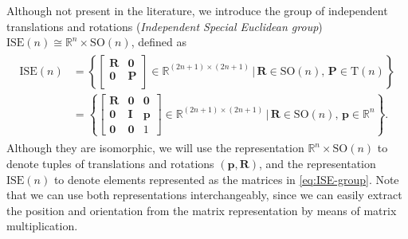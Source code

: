 \begin{example}\label{ex:independent-translation-rotation-ISE}
    Although not present in the literature, we introduce the group of independent translations and rotations (\emph{Independent Special Euclidean group}) $\text{ISE}(n)\cong\mathbb{R}^n\times\text{SO}(n)$, defined as
    \begin{align}
        \begin{split}
            \text{ISE}(n) &= \left\{\begin{bmatrix}
            \mathbf{R} & \mathbf{0}\\
            \mathbf{0} & \mathbf{P}\\
            \end{bmatrix}\in\mathbb{R}^{(2n+1)\times(2n+1)}\,|\, \mathbf{R}\in\text{SO}(n),\,\mathbf{P}\in\text{T}(n)\right\}\\
            &= \left\{\begin{bmatrix}
            \mathbf{R} & \mathbf{0} & \mathbf{0}\\
            \mathbf{0} & \mathbf{I} & \mathbf{p}\\
            \mathbf{0} & \mathbf{0} & 1
            \end{bmatrix}\in\mathbb{R}^{(2n+1)\times(2n+1)}\,|\, \mathbf{R}\in\text{SO}(n),\,\mathbf{p}\in\mathbb{R}^n\right\}.
        \end{split} \label{eq:ISE-group}
    \end{align}
    Although they are isomorphic, we will use the representation $\mathbb{R}^n\times \text{SO}(n)$ to denote tuples of translations and rotations $(\mathbf{p},\mathbf{R})$, and the representation $\text{ISE}(n)$ to denote elements represented as the matrices in \eqref{eq:ISE-group}. Note that we can use both representations interchangeably, since we can easily extract the position and orientation from the matrix representation by means of matrix multiplication.
\end{example}
